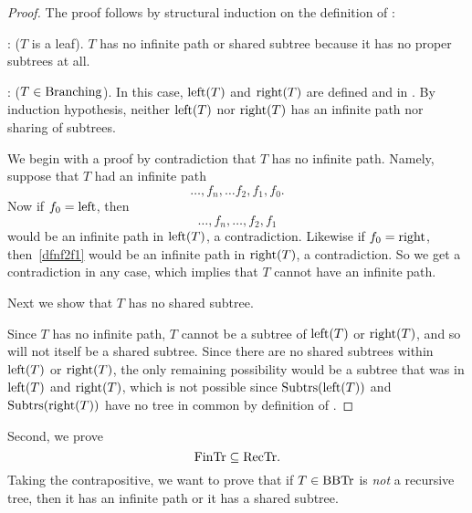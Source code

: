 \begin{proof}
The proof follows by structural induction on the
definition of \rectr:

: ($T$ is a leaf).  $T$ has no infinite path
or shared subtree because it has no proper subtrees at all.

: ($T \in \text{Branching}$).  In this case,
$\text{left}(T)$ and $\text{right}(T)$ are defined and in \rectr.  By
induction hypothesis, neither $\text{left}(T)$ nor $\text{right}(T)$ has an
infinite path nor sharing of subtrees.

We begin with a proof by contradiction that $T$ has no infinite path.
Namely, suppose that $T$ had an infinite path
\[
\dots,f_n,\dots f_2,f_1,f_0.
\]
Now if $f_0 = \leftsub$, then
\begin{equation}\label{dfnf2f1}
\dots,f_n,\dots,f_2,f_1
\end{equation}
would be an infinite path in $\text{left}(T)$, a contradiction.  Likewise
if $f_0 = \rightsub$, then~\eqref{dfnf2f1} would be an infinite path
in $\text{right}(T)$, a contradiction.  So we get a contradiction in any
case, which implies that $T$ cannot have an infinite path.

Next we show that $T$ has no shared subtree.

Since $T$ has no infinite path, $T$ cannot be a subtree of
$\text{left}(T)$ or $\text{right}(T)$, and so will not itself be a
shared subtree.  Since there are no shared subtrees within
$\text{left}(T)$ or $\text{right}(T)$, the only remaining possibility
would be a subtree that was in $\text{left}(T)$ and $\text{right}(T)$,
which is not possible since $\text{Subtrs}(\text{left}(T))$ and
$\text{Subtrs}(\text{right}(T))$ have no tree in common by definition of
\rectr.
\end{proof}

Second, we prove
\begin{equation}\label{fintrsubrectr}
\text{FinTr} \subseteq \text{RecTr}.
\end{equation}
Taking the contrapositive, we want to prove that if $T \in \text{BBTr}$ is
\emph{not} a recursive tree, then it has an infinite path or it has a
shared subtree.

